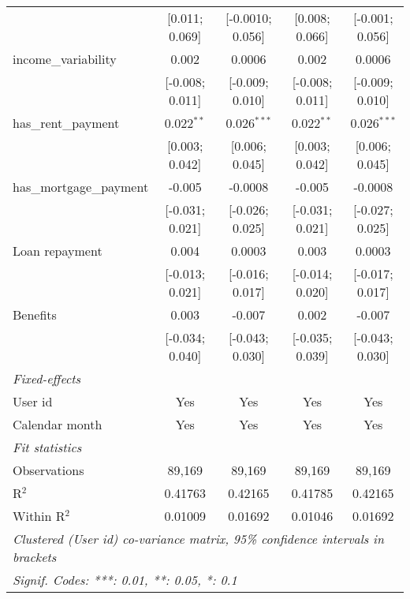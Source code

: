 \begin{table}[htbp]
\begin{threeparttable}[b]
\begin{tabular}{lcccc}
                                  & [0.011; 0.069]    & [-0.0010; 0.056] & [0.008; 0.066]   & [-0.001; 0.056]\\   
         income\_variability      & 0.002             & 0.0006           & 0.002            & 0.0006\\   
                                  & [-0.008; 0.011]   & [-0.009; 0.010]  & [-0.008; 0.011]  & [-0.009; 0.010]\\   
         has\_rent\_payment       & 0.022$^{**}$      & 0.026$^{***}$    & 0.022$^{**}$     & 0.026$^{***}$\\   
                                  & [0.003; 0.042]    & [0.006; 0.045]   & [0.003; 0.042]   & [0.006; 0.045]\\   
         has\_mortgage\_payment   & -0.005            & -0.0008          & -0.005           & -0.0008\\   
                                  & [-0.031; 0.021]   & [-0.026; 0.025]  & [-0.031; 0.021]  & [-0.027; 0.025]\\   
         Loan repayment           & 0.004             & 0.0003           & 0.003            & 0.0003\\   
                                  & [-0.013; 0.021]   & [-0.016; 0.017]  & [-0.014; 0.020]  & [-0.017; 0.017]\\   
         Benefits                 & 0.003             & -0.007           & 0.002            & -0.007\\   
                                  & [-0.034; 0.040]   & [-0.043; 0.030]  & [-0.035; 0.039]  & [-0.043; 0.030]\\   
         \midrule
         \emph{Fixed-effects}\\
         User id                  & Yes               & Yes              & Yes              & Yes\\  
         Calendar month           & Yes               & Yes              & Yes              & Yes\\  
         \midrule
         \emph{Fit statistics}\\
         Observations             & 89,169            & 89,169           & 89,169           & 89,169\\  
         R$^2$                    & 0.41763           & 0.42165          & 0.41785          & 0.42165\\  
         Within R$^2$             & 0.01009           & 0.01692          & 0.01046          & 0.01692\\  
         \midrule \midrule
         \multicolumn{5}{l}{\emph{Clustered (User id) co-variance matrix, 95\% confidence intervals in brackets}}\\
         \multicolumn{5}{l}{\emph{Signif. Codes: ***: 0.01, **: 0.05, *: 0.1}}\\
      \end{tabular}
      

\end{threeparttable}
\end{table}
